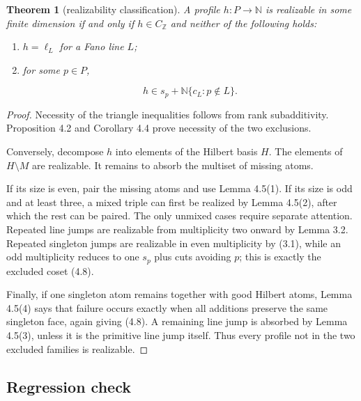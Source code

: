 \documentclass[11pt]{article}
\newtheorem{theorem}{Theorem}[section]
\theoremstyle{remark}
\numberwithin{equation}{section}
\begin{document}
\Needspace{0.28\textheight}
\begin{theorem}[realizability classification]

A profile $h:P\to\mathbb N$ is realizable in some finite dimension if and only
if $h\in C_{\mathbb Z}$ and neither of the following holds:

\begin{enumerate}
\item $h=\ell_L$ for a Fano line $L$;
\item for some $p\in P$,

\nopagebreak[4]
\[
   h\in s_p+\mathbb N\{c_L:p\notin L\}.
   \tag{4.8}
\]

\end{enumerate}

\end{theorem}

\begin{proof}

Necessity of the triangle inequalities follows from rank subadditivity.
Proposition 4.2 and Corollary 4.4 prove necessity of the two exclusions.

Conversely, decompose $h$ into elements of the Hilbert basis $H$. The elements
of $H\setminus M$ are realizable. It remains to absorb the multiset of missing
atoms.

If its size is even, pair the missing atoms and use Lemma 4.5(1). If its size is
odd and at least three, a mixed triple can first be realized by Lemma 4.5(2),
after which the rest can be paired. The only unmixed cases require separate
attention. Repeated line jumps are realizable from multiplicity two onward by
Lemma 3.2. Repeated singleton jumps are realizable in even multiplicity by
(3.1), while an odd multiplicity reduces to one $s_p$ plus cuts avoiding $p$;
this is exactly the excluded coset (4.8).

Finally, if one singleton atom remains together with good Hilbert atoms,
Lemma 4.5(4) says that failure occurs exactly when all additions preserve the
same singleton face, again giving (4.8). A remaining line jump is absorbed by
Lemma 4.5(3), unless it is the primitive line jump itself. Thus every profile
not in the two excluded families is realizable.
\end{proof}


\subsection*{Regression check}
\end{document}
